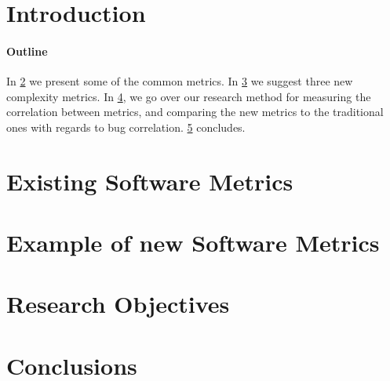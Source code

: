 \documentclass[10pt,twocolumn]{article}
\author{Lior Samuel\\
	Department of Computer Science\\
	Technion---Israel Institute of Technology\\
	\texttt{\small \href{mailto:liorsam@campus.Technion.ac.il}{liorsam@campus.Technion.ac.il}}}
\date{\small Advisor: Prof.\ Yossi Gil}
\begin{document}
\maketitle
  
\begin{abstract}
	 
\end{abstract}

\section{Introduction}


\paragraph{Outline} 
In \cref{Section:metrics} we present some of the common metrics.
In \cref{Section:new-metrics} we suggest three new complexity metrics.
In \cref{Section:objectives}, we go over our research method for measuring
the correlation between metrics, and comparing the new metrics to the
traditional ones with regards to bug correlation.
\cref{Section:zz} concludes. 

\section{Existing Software Metrics}
\label{Section:metrics}
%

\section{Example of new Software Metrics}
\label{Section:new-metrics}
% 

\section{Research Objectives}
\label{Section:objectives}
%

\section{Conclusions}
\label{Section:zz}



%
\end{document}
